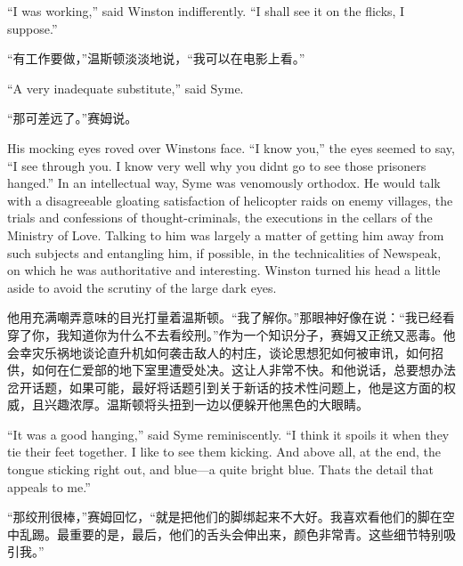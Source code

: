 \begin{paracol}{2}
\switchcolumn*

``I was working,'' said Winston indifferently. ``I shall see it on the
flicks, I suppose.''

\switchcolumn

``有工作要做，''温斯顿淡淡地说，``我可以在电影上看。''

\switchcolumn*

``A very inadequate substitute,'' said Syme.

\switchcolumn

``那可差远了。''赛姆说。

\switchcolumn*

His mocking eyes roved over Winston\textquotesingle s face. ``I know
you,'' the eyes seemed to say, ``I see through you. I know very well why
you didn\textquotesingle t go to see those prisoners hanged.'' In an
intellectual way, Syme was venomously orthodox. He would talk with a
disagreeable gloating satisfaction of helicopter raids on enemy
villages, the trials and confessions of thought-criminals, the
executions in the cellars of the Ministry of Love. Talking to him was
largely a matter of getting him away from such subjects and entangling
him, if possible, in the technicalities of Newspeak, on which he was
authoritative and interesting. Winston turned his head a little aside to
avoid the scrutiny of the large dark eyes.

\switchcolumn

他用充满嘲弄意味的目光打量着温斯顿。``我了解你。''那眼神好像在说：``我已经看穿了你，我知道你为什么不去看绞刑。''作为一个知识分子，赛姆又正统又恶毒。他会幸灾乐祸地谈论直升机如何袭击敌人的村庄，谈论思想犯如何被审讯，如何招供，如何在仁爱部的地下室里遭受处决。这让人非常不快。和他说话，总要想办法岔开话题，如果可能，最好将话题引到关于新话的技术性问题上，他是这方面的权威，且兴趣浓厚。温斯顿将头扭到一边以便躲开他黑色的大眼睛。

\switchcolumn*

``It was a good hanging,'' said Syme reminiscently. ``I think it spoils it
when they tie their feet together. I like to see them kicking. And above
all, at the end, the tongue sticking right out, and blue---a quite
bright blue. That\textquotesingle s the detail that appeals to me.''

\switchcolumn

``那绞刑很棒，''赛姆回忆，``就是把他们的脚绑起来不大好。我喜欢看他们的脚在空中乱踢。最重要的是，最后，他们的舌头会伸出来，颜色非常青。这些细节特别吸引我。''

\switchcolumn*


\end{paracol}

